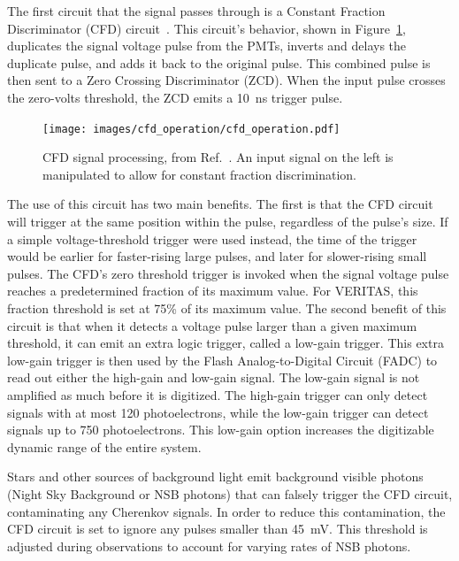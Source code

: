 The first circuit that the signal passes through is a Constant Fraction Discriminator (CFD) circuit~\cite{cfd_behavior}.
This circuit's behavior, shown in Figure~\ref{fig:cfd_operation}, duplicates the signal voltage pulse from the PMTs, inverts and delays the duplicate pulse, and adds it back to the original pulse.
This combined pulse is then sent to a Zero Crossing Discriminator (ZCD).
When the input pulse crosses the zero-volts threshold, the ZCD emits a \SI{10}{ns} trigger pulse.

\begin{figure}[ht]
  \centering
  \texttt{[image: images/cfd\_operation/cfd\_operation.pdf]}
  \caption[CFD Operation]{
    CFD signal processing, from Ref.~\cite{cfd_operation}.
    An input signal on the left is manipulated to allow for constant fraction discrimination.
  }
  \label{fig:cfd_operation}
\end{figure}

The use of this circuit has two main benefits.
The first is that the CFD circuit will trigger at the same position within the pulse, regardless of the pulse's size.
If a simple voltage-threshold trigger were used instead, the time of the trigger would be earlier for faster-rising large pulses, and later for slower-rising small pulses.
The CFD's zero threshold trigger is invoked when the signal voltage pulse reaches a predetermined fraction of its maximum value.
For VERITAS, this fraction threshold is set at 75\% of its maximum value.
The second benefit of this circuit is that when it detects a voltage pulse larger than a given maximum threshold, it can emit an extra logic trigger, called a low-gain trigger.
This extra low-gain trigger is then used by the Flash Analog-to-Digital Circuit (FADC) to read out either the high-gain and low-gain signal.
The low-gain signal is not amplified as much before it is digitized.
The high-gain trigger can only detect signals with at most 120 photoelectrons, while the low-gain trigger can detect signals up to 750 photoelectrons.
This low-gain option increases the digitizable dynamic range of the entire system.

Stars and other sources of background light emit background visible photons (Night Sky Background or NSB photons) that can falsely trigger the CFD circuit, contaminating any Cherenkov signals.
In order to reduce this contamination, the CFD circuit is set to ignore any pulses smaller than \SI{45}{mV}.
This threshold is adjusted during observations to account for varying rates of NSB photons.

